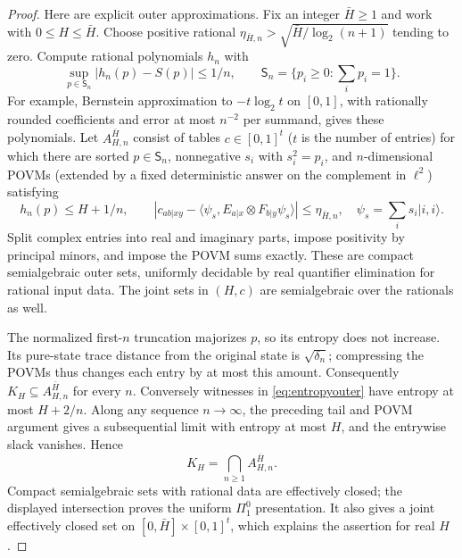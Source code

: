 \begin{proof}
Here are explicit outer approximations. Fix an integer $\bar H\ge1$ and work
with $0\le H\le\bar H$. Choose positive rational
$\eta_{\bar H,n}>\sqrt{\bar H/\log_2(n+1)}$ tending to zero. Compute rational
polynomials $h_n$ with
\[
 \sup_{p\in\mathsf S_n}|h_n(p)-S(p)|\le1/n,
 \qquad \mathsf S_n=\{p_i\ge0:\textstyle\sum_i p_i=1\}.
\]
For example, Bernstein approximation to $-t\log_2t$ on $[0,1]$, with
rationally rounded coefficients and error at most $n^{-2}$ per summand,
gives these polynomials. Let $A^{\bar H}_{H,n}$ consist of tables $c\in[0,1]^t$
($t$ is the number of entries) for which there are sorted $p\in\mathsf S_n$,
nonnegative $s_i$ with $s_i^2=p_i$, and $n$-dimensional POVMs (extended by a fixed deterministic answer on the complement in $\ell^2$) satisfying
\begin{equation}\label{eq:entropyouter}
 h_n(p)\le H+1/n,\qquad
 |c_{ab|xy}-\langle\psi_s,E_{a|x}\otimes F_{b|y}\psi_s\rangle|
 \le\eta_{\bar H,n},\quad \psi_s=\sum_i s_i|i,i\rangle.
\end{equation}
Split complex entries into real and imaginary parts, impose positivity
by principal minors, and impose the POVM sums exactly. These are compact
semialgebraic outer sets, uniformly decidable by real quantifier
elimination \cite[Chapter~14]{BPR} for rational input data. The joint sets in $(H,c)$
are semialgebraic over the rationals as well.

The normalized first-$n$ truncation majorizes $p$, so its entropy does not
increase. Its pure-state trace distance from the original state is
$\sqrt{\delta_n}$; compressing the POVMs thus changes each entry by at most
this amount. Consequently $K_H\subseteq A^{\bar H}_{H,n}$ for every $n$.
Conversely witnesses in \eqref{eq:entropyouter} have entropy at most
$H+2/n$. Along any sequence $n\to\infty$, the preceding tail and POVM
argument gives a subsequential limit with entropy at most $H$, and the
entrywise slack vanishes. Hence
\[
 K_H=\bigcap_{n\ge1}A^{\bar H}_{H,n}.
\]
Compact semialgebraic sets with rational data are effectively closed;
the displayed intersection proves the uniform $\Pi^0_1$ presentation.
It also gives a joint effectively closed set on $[0,\bar H]\times[0,1]^t$,
which explains the assertion for real $H$.
\end{proof}

